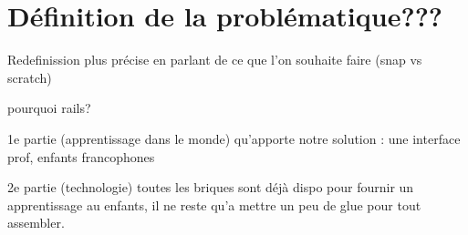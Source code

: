 \section{Définition de la problématique???}
Redefinission plus précise en parlant de ce que l'on souhaite faire (snap vs scratch)

pourquoi rails?

1e partie (apprentissage dans le monde) qu'apporte notre solution : une interface prof, enfants francophones

2e partie (technologie) toutes les briques sont déjà dispo pour fournir un apprentissage au enfants, il ne reste qu'a mettre un peu de glue pour tout assembler.
